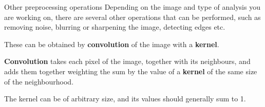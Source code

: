\documentclass[9pt, aspectratio=169]{beamer}
\begin{document}
\begin{frame}
	{Other preprocessing operations}
	Depending on the image and type of analysis you are working on, there are several other operations that can be performed, such as removing noise, blurring or sharpening the image, detecting edges etc.

	These can be obtained by \textbf{convolution} of the image with a \textbf{kernel}.

	\textbf{Convolution} takes each pixel of the image, together with its neighbours, and adds them together weighting the sum by the value of a \textbf{kernel} of the same size of the neighbourhood.

	\pause
	The kernel can be of arbitrary size, and its values should generally sum to 1.
\end{frame}
\end{document}
